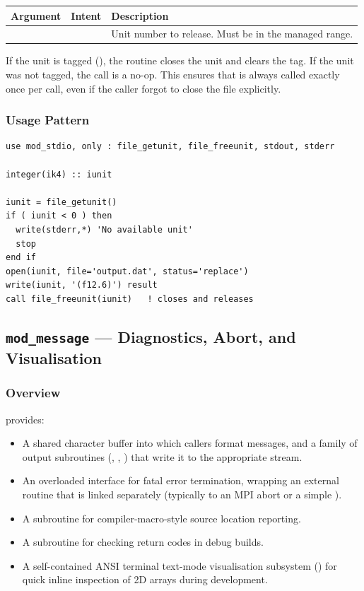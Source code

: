 \begin{longtable}{L{3cm} L{3cm} L{8cm}}
  \toprule
  \textbf{Argument} & \textbf{Intent} & \textbf{Description} \\
  \midrule
  \endhead
  \bottomrule
  \endfoot
   &  & Unit number to release. Must be in the
    managed range. \\
\end{longtable}

If the unit is tagged (), the routine closes
the unit and clears the tag. If the unit was not tagged, the call is a no-op.
This ensures that  is always called exactly once per
 call, even if the caller forgot to close the file
explicitly.

\subsubsection{Usage Pattern}

\begin{lstlisting}
use mod_stdio, only : file_getunit, file_freeunit, stdout, stderr

integer(ik4) :: iunit

iunit = file_getunit()
if ( iunit < 0 ) then
  write(stderr,*) 'No available unit'
  stop
end if
open(iunit, file='output.dat', status='replace')
write(iunit, '(f12.6)') result
call file_freeunit(iunit)   ! closes and releases
\end{lstlisting}

\subsection{\texttt{mod\_message} --- Diagnostics, Abort, and Visualisation}
\label{subsec:message}

\subsubsection{Overview}

 provides:
\begin{itemize}
  \item A shared character buffer  into which callers format
        messages, and a family of output subroutines (, ,
        ) that write it to the appropriate stream.
  \item An overloaded  interface for fatal error termination,
        wrapping an external  routine that is linked separately
        (typically to an MPI abort or a simple ).
  \item A  subroutine for compiler-macro-style source location
        reporting.
  \item A  subroutine for checking  return
        codes in debug builds.
  \item A self-contained ANSI terminal text-mode visualisation subsystem
        () for quick inline inspection of 2D arrays during
        development.
\end{itemize}

